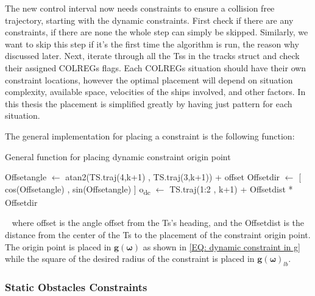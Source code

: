The new control interval now needs constraints to ensure a collision free trajectory, starting with the dynamic constraints.
First check if there are any constraints, if there are none the whole step can simply be skipped. Similarly, we want to skip
this step if it's the first time the algorithm is run, the reason why discussed later.
Next, iterate through all the \gls{Ts}s in the tracks struct and check their assigned COLREGs flags.
Each COLREGs situation should have their own constraint locations, however the optimal placement
will depend on situation complexity, available space, velocities of the ships involved, and other factors. In
this thesis the placement is simplified greatly by having just pattern for each situation.

The general implementation for placing a constraint is the following function:
\begin{algorithm}[ht]
    \caption{General function for placing dynamic constraint origin point}
    \label{ALG: dynamic constraint origin}
    \begin{algorithmic}
        \State Offsetangle $\gets$ atan2(TS.traj(4,k+1) , TS.traj(3,k+1)) + offset
        \State Offsetdir $\gets$ [ cos(Offsetangle) , sin(Offsetangle) ]
        \State o\textsubscript{dc} $\gets$ TS.traj(1:2 , k+1) + Offsetdist * Offsetdir
    \end{algorithmic}
\end{algorithm}
 \newline
where offset is the angle offset from the \gls{Ts}'s heading, and the Offsetdist is the distance from the center of the
\gls{Ts} to the placement of the constraint origin point. The origin point is placed in $\textbf{g}(\bm{\omega})$
as shown in \eqref{EQ: dynamic constraint in g} while the square of the desired radius of the constraint is placed in
$\textbf{g}(\bm{\omega})_{lb}$.



\subsubsection*{Static Obstacles Constraints} \label{Chap: Method Static Obs}



